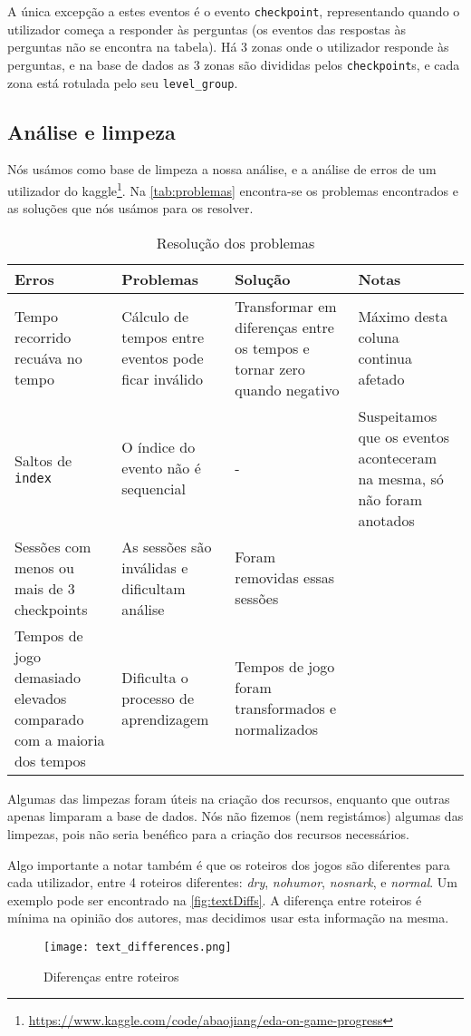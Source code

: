 \documentclass[justified, 11pt]{scrartcl}
\begin{document}
  A única excepção a estes eventos é o evento \texttt{checkpoint}, representando quando o utilizador começa a responder às perguntas (os eventos das respostas às perguntas não se encontra na tabela). Há 3 zonas onde o utilizador responde às perguntas, e na base de dados as 3 zonas são divididas pelos \texttt{checkpoint}s, e cada zona está rotulada pelo seu \texttt{level\_group}.

  \subsection{Análise e limpeza}
  Nós usámos como base de limpeza a nossa análise, e a análise de erros de um utilizador do kaggle\footnote{\url{https://www.kaggle.com/code/abaojiang/eda-on-game-progress}}. Na \autoref{tab:problemas} encontra-se os problemas encontrados e as soluções que nós usámos para os resolver.
  \begin{table}[htb]
    \centering
    \caption{Resolução dos problemas}
    \label{tab:problemas}
    \setlength{\extrarowheight}{7pt}
    \begin{tabulary}{\textwidth}{ L L L L }

      \toprule
      Erros & Problemas & Solução & Notas \\
      \midrule
      Tempo recorrido recuáva no tempo & Cálculo de tempos entre eventos pode ficar inválido & Transformar em diferenças entre os tempos e tornar zero quando negativo & Máximo desta coluna continua afetado \\
      Saltos de \texttt{index} & O índice do evento não é sequencial & - & Suspeitamos que os eventos aconteceram na mesma, só não foram anotados\\
      Sessões com menos ou mais de 3 checkpoints & As sessões são inválidas e dificultam análise & Foram removidas essas sessões & \\
      Tempos de jogo demasiado elevados comparado com a maioria dos tempos & Dificulta o processo de aprendizagem & Tempos de jogo foram transformados e normalizados &
    \end{tabulary}
  \end{table}

  Algumas das limpezas foram úteis na criação dos recursos, enquanto que outras apenas limparam a base de dados. Nós não fizemos (nem registámos) algumas das limpezas, pois não seria benéfico para a criação dos recursos necessários.

  Algo importante a notar também é que os roteiros dos jogos são diferentes para cada utilizador, entre 4 roteiros diferentes: \textit{dry}, \textit{nohumor}, \textit{nosnark}, e \textit{normal}. Um exemplo pode ser encontrado na \autoref{fig:textDiffs}. A diferença entre roteiros é mínima na opinião dos autores, mas decidimos usar esta informação na mesma.
  \begin{figure}[h]
    \centering
    \texttt{[image: text\_differences.png]}
    \caption{Diferenças entre roteiros}
    \label{fig:textDiffs}
  \end{figure}
\end{document}
